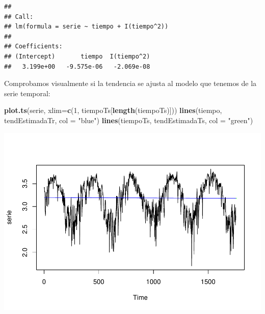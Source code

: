 \documentclass[]{article}
\newenvironment{Shaded}{\begin{snugshade}}{\end{snugshade}}
\newcommand{\KeywordTok}[1]{\textcolor[rgb]{0.13,0.29,0.53}{\textbf{#1}}}
\newcommand{\DataTypeTok}[1]{\textcolor[rgb]{0.13,0.29,0.53}{#1}}
\newcommand{\DecValTok}[1]{\textcolor[rgb]{0.00,0.00,0.81}{#1}}
\newcommand{\StringTok}[1]{\textcolor[rgb]{0.31,0.60,0.02}{#1}}
\newcommand{\CommentTok}[1]{\textcolor[rgb]{0.56,0.35,0.01}{\textit{#1}}}
\newcommand{\OperatorTok}[1]{\textcolor[rgb]{0.81,0.36,0.00}{\textbf{#1}}}
\newcommand{\NormalTok}[1]{#1}
\begin{document}
\begin{verbatim}
## 
## Call:
## lm(formula = serie ~ tiempo + I(tiempo^2))
## 
## Coefficients:
## (Intercept)       tiempo  I(tiempo^2)  
##   3.199e+00   -9.575e-06   -2.069e-08
\end{verbatim}

\begin{Shaded}
\end{Shaded}

Comprobamos visualmente si la tendencia se ajusta al modelo que tenemos
de la serie temporal:

\begin{Shaded}
\begin{Highlighting}[]
\KeywordTok{plot.ts}\NormalTok{(serie, }\DataTypeTok{xlim=}\KeywordTok{c}\NormalTok{(}\DecValTok{1}\NormalTok{, tiempoTs[}\KeywordTok{length}\NormalTok{(tiempoTs)])) }
\KeywordTok{lines}\NormalTok{(tiempo, tendEstimadaTr, }\DataTypeTok{col =} \StringTok{"blue"}\NormalTok{) }
\KeywordTok{lines}\NormalTok{(tiempoTs, tendEstimadaTs, }\DataTypeTok{col =} \StringTok{"green"}\NormalTok{)}
\end{Highlighting}
\end{Shaded}

\includegraphics{timeSeries_files/figure-latex/unnamed-chunk-50-1.pdf}
\end{document}
